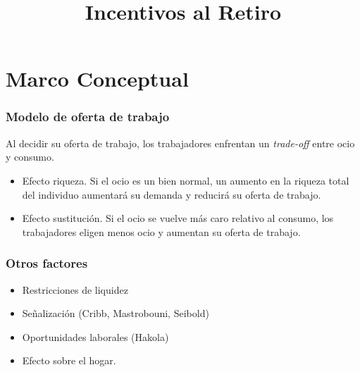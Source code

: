 \documentclass{beamer}
\title{Incentivos al Retiro}
\begin{document}
\begin{frame}
\maketitle
\end{frame}


\section{Marco Conceptual}


\frame
{
  \frametitle{Modelo de oferta de trabajo}
  
    Al decidir su oferta de trabajo, los trabajadores enfrentan un \textit{trade-off} entre ocio y consumo.

    \begin{itemize} 
      \item Efecto riqueza. Si el ocio es un bien normal, un aumento en la riqueza total del individuo aumentará su demanda y reducirá su oferta de trabajo.
      \item Efecto sustitución. Si el ocio se vuelve más caro relativo al consumo, los trabajadores eligen menos ocio y aumentan su oferta de trabajo.
    \end{itemize}
    }
    \frame
    {
      \frametitle{Otros factores}
      \begin{itemize}
      \item Restricciones de liquidez
      \item Señalización (Cribb, Mastrobouni, Seibold)
      \item Oportunidades laborales (Hakola)
      \item Efecto sobre el hogar.
      \end{itemize}
      
    }
    
\end{document}
